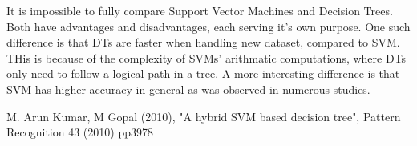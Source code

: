 \hspace{0.5cm} It is impossible to fully compare Support Vector Machines and Decision Trees. Both have advantages and disadvantages, each serving it's own purpose. One such difference is that DTs are faster when handling new dataset, compared to SVM. THis is because of the complexity of SVMs' arithmatic computations, where DTs only need to follow a logical path in a tree. A more interesting difference is that SVM has higher accuracy in general as was observed in numerous studies. \newline

M. Arun Kumar, M Gopal (2010), "A hybrid SVM based decision tree", Pattern Recognition 43 (2010) pp3978 \newline